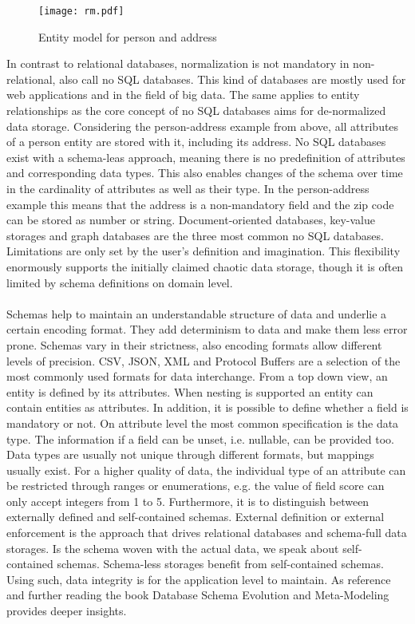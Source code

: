 \begin{figure}[htb]
  \centering
  \texttt{[image: rm.pdf]}\\
  \caption{Entity model for person and address}\label{fig:rm}
\end{figure}

In contrast to relational databases, normalization is not mandatory in non-relational, also call no SQL databases. This kind of databases are mostly used for web applications and in the field of big data. The same applies to entity relationships as the core concept of no SQL databases aims for de-normalized data storage. Considering the person-address example from above, all attributes of a person entity are stored with it, including its address. No SQL databases exist with a schema-leas approach, meaning there is no predefinition of attributes and corresponding data types. This also enables changes of the schema over time in the cardinality of attributes as well as their type. In the person-address example this means that the address is a non-mandatory field and the zip code can be stored as number or string. Document-oriented databases, key-value storages and graph databases are the three most common no SQL databases.  Limitations are only set by the user's definition and imagination. This flexibility enormously supports the initially claimed chaotic data storage, though it is often limited by schema definitions on domain level. 
\\\\
Schemas help to maintain an understandable structure of data and underlie a certain encoding format. They add determinism to data and make them less error prone. Schemas vary in their strictness, also encoding formats allow different levels of precision. CSV, JSON, XML and Protocol Buffers are a selection of the most commonly used formats for data interchange. From a top down view, an entity is defined by its attributes. When nesting is supported an entity can contain entities as attributes. In addition, it is possible to define whether a field is mandatory or not. On attribute level the most common specification is the data type. The information if a field can be unset, i.e. nullable, can be provided too. Data types are usually not unique through different formats, but mappings usually exist. For a higher quality of data, the individual type of an attribute can be restricted through ranges or enumerations, e.g. the value of field score can only accept integers from 1 to 5. Furthermore, it is to distinguish between externally defined and self-contained schemas. External definition or external enforcement is the approach that drives relational databases and schema-full data storages. Is the schema woven with the actual data, we speak about self-contained schemas. Schema-less storages benefit from self-contained schemas. Using such, data integrity is for the application level to maintain. As reference and further reading the book Database Schema Evolution and Meta-Modeling \cite{balsters_brock_conrad_2006} provides deeper insights.
